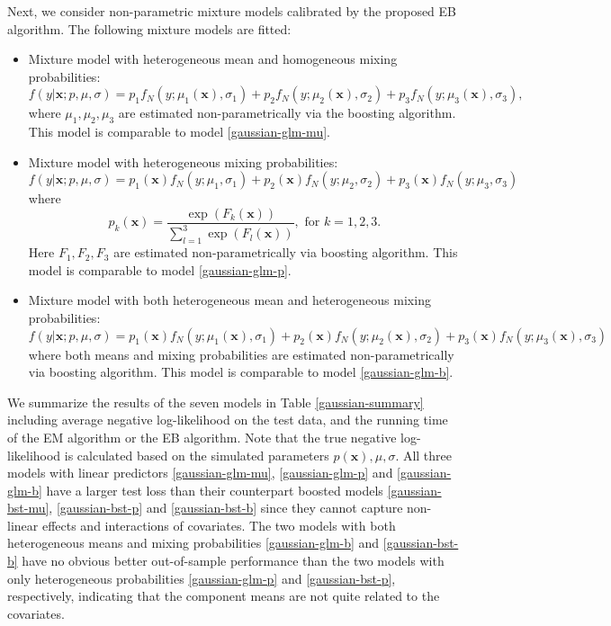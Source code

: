 \documentclass[11pt]{article}
\numberwithin{equation}{section}
\def\bx{\boldsymbol{x}}
\begin{document}
Next, we consider non-parametric mixture models calibrated by the proposed EB algorithm. The following mixture models are fitted:
\begin{itemize}
\item Mixture model with heterogeneous mean and homogeneous mixing probabilities:
\begin{equation}\label{gaussian-bst-mu}
	f(y|\bx;p,\mu,\sigma)=p_1f_N(y;\mu_1(\bx),\sigma_1)+p_2f_N(y;\mu_2(\bx),\sigma_2)+p_3f_N(y;\mu_3(\bx),\sigma_3),
\end{equation}
where $\mu_1,\mu_2,\mu_3$ are estimated non-parametrically via the boosting algorithm. This model is comparable to model \eqref{gaussian-glm-mu}.

\item Mixture model with heterogeneous mixing probabilities:
\begin{equation}\label{gaussian-bst-p}
	f(y|\bx;p,\mu,\sigma)=p_1(\bx)f_N(y;\mu_1,\sigma_1)+p_2(\bx)f_N(y;\mu_2,\sigma_2)+p_3(\bx)f_N(y;\mu_3,\sigma_3)
\end{equation}
where
\begin{equation}\label{bst-p}
	p_k(\bx)=\frac{\exp\left(F_k(\bx)\right)}{\sum_{l=1}^{3}\exp\left(F_l(\bx)\right)}, \text{ for } k=1,2,3.
\end{equation}
Here $F_1,F_2,F_3$ are estimated non-parametrically via boosting algorithm. This model is comparable to model \eqref{gaussian-glm-p}.

\item Mixture model with both heterogeneous mean and heterogeneous mixing probabilities:
\begin{equation}\label{gaussian-bst-b}
	f(y|\bx;p,\mu,\sigma)=p_1(\bx)f_N(y;\mu_1(\bx),\sigma_1)+p_2(\bx)f_N(y;\mu_2(\bx),\sigma_2)+p_3(\bx)f_N(y;\mu_3(\bx),\sigma_3)
\end{equation}
where both means and mixing probabilities are estimated non-parametrically via boosting algorithm. This model is comparable to model \eqref{gaussian-glm-b}.
\end{itemize}

We summarize the results of the seven models in Table \ref{gaussian-summary} including average negative log-likelihood on the test data, and the running time of the EM algorithm or the EB algorithm. 
Note that the true negative log-likelihood is calculated based on the simulated parameters $p(\bx), \mu,\sigma$.
All three models with linear predictors  \eqref{gaussian-glm-mu}, \eqref{gaussian-glm-p} and \eqref{gaussian-glm-b} have a larger test loss 
than their counterpart boosted models \eqref{gaussian-bst-mu}, \eqref{gaussian-bst-p} and \eqref{gaussian-bst-b} 
since they cannot capture non-linear effects and interactions of covariates.
The two models with both heterogeneous means and mixing probabilities \eqref{gaussian-glm-b} and \eqref{gaussian-bst-b}  have no obvious better out-of-sample performance than the two models with only heterogeneous probabilities \eqref{gaussian-glm-p} and \eqref{gaussian-bst-p}, respectively,
indicating that the component means are not quite related to the covariates.
\end{document}
